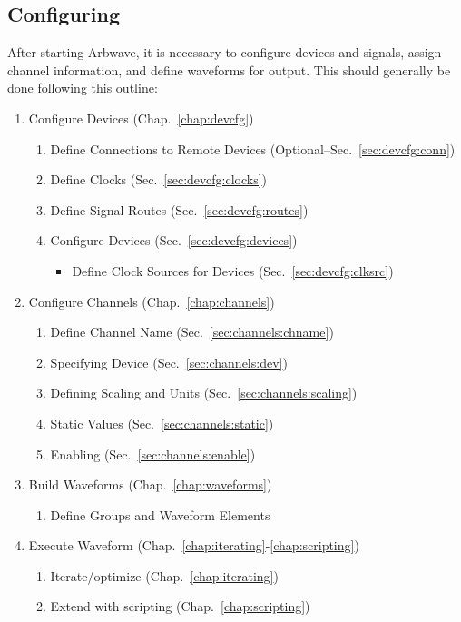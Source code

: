 \subsection{Configuring}
After starting Arbwave, it is necessary to configure devices and signals,
assign channel information, and define waveforms for output.  This should
generally be done following this outline:
%
\begin{enumerate}
  \item Configure Devices (Chap.~\ref{chap:devcfg})

    \begin{enumerate}
      \item Define Connections to Remote Devices
           (Optional--Sec.~\ref{sec:devcfg:conn})

      \item Define Clocks (Sec.~\ref{sec:devcfg:clocks})

      \item Define Signal Routes (Sec.~\ref{sec:devcfg:routes})

      \item Configure Devices (Sec.~\ref{sec:devcfg:devices})
        \begin{itemize}
          \item Define Clock Sources for Devices (Sec.~\ref{sec:devcfg:clksrc})
        \end{itemize}

    \end{enumerate}
  \item Configure Channels (Chap.~\ref{chap:channels})
    \begin{enumerate}
      \item Define Channel Name (Sec.~\ref{sec:channels:chname})
      \item Specifying Device (Sec.~\ref{sec:channels:dev})
      \item Defining Scaling and Units (Sec.~\ref{sec:channels:scaling})
      \item Static Values (Sec.~\ref{sec:channels:static})
      \item Enabling (Sec.~\ref{sec:channels:enable})
    \end{enumerate}

  \item Build Waveforms (Chap.~\ref{chap:waveforms})
    \begin{enumerate}
      \item Define Groups and Waveform Elements
    \end{enumerate}
  \item Execute Waveform (Chap.~\ref{chap:iterating}-\ref{chap:scripting})
    \begin{enumerate}
      \item Iterate/optimize (Chap.~\ref{chap:iterating})
      \item Extend with scripting (Chap.~\ref{chap:scripting})
    \end{enumerate}
\end{enumerate}
